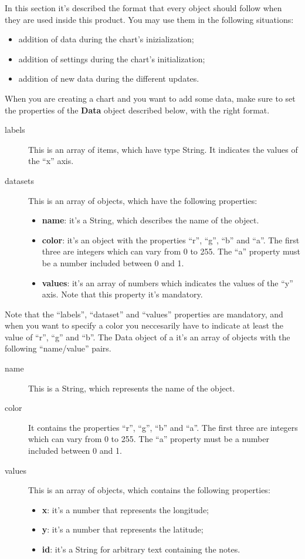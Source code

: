 	In this section it's described the format that every  object should follow when they are used inside this product. You may use them in the following situations:
	\begin{itemize}
		\item addition of data during the chart's inizialization;
		\item addition of settings during the chart's initialization;
		\item addition of new data during the different updates.
	\end{itemize}

	When you are creating a chart and you want to add some data, make sure to set the properties of the \textbf{Data} object described below, with the right format.
		 \label{sec:dataBarLine}
		\begin{description}
			\item[labels] This is an array of items, which have type String. It indicates the values of the “x” axis.
			\item[datasets] This is an array of objects, which have the following properties: 
				\begin{itemize}
					\item \textbf{name}: it's a String, which describes the name of the object. 
					\item \textbf{color}: it's an object with the properties “r”, “g”, “b” and “a”. The first three are integers which can vary from 0 to 255. The “a” property must be a number included between 0 and 1. 
					\item \textbf{values}: it's an array of numbers which indicates the values of the “y” axis.
					Note that this property it's mandatory.
				\end{itemize}
		\end{description}
		Note that the “labels”, “dataset” and “values” properties are mandatory, and when you want to specify a color you neccesarily have to indicate at least the value of “r”, “g” and “b”.
		The Data object of a  it's an array of objects with the following “name/value” pairs.
		\begin{description}
			\item[name] This is a String, which represents the name of the object.
			\item[color] It contains the properties “r”, “g”, “b” and “a”. The first three are integers which can vary from 0 to 255. The “a” property must be a number included between 0 and 1. 
			\item[values] This is an array of objects, which contains the following properties:
				\begin{itemize}
					\item \textbf{x}: it's a number that represents the longitude;
					\item \textbf{y}: it's a number that represents the latitude;
					\item \textbf{id}: it's a String for arbitrary text containing the notes.
				\end{itemize}
		\end{description}
